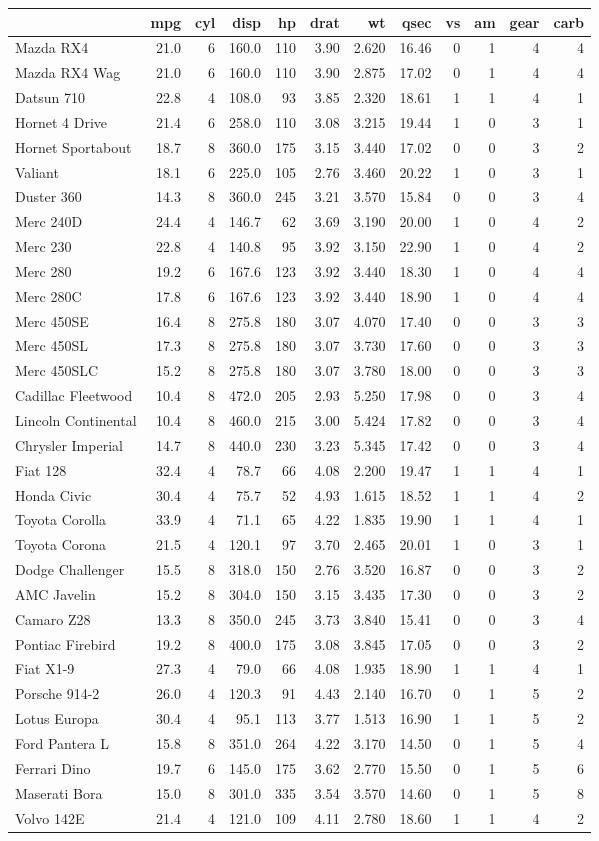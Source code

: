 \documentclass[11pt,english,a4paper,oneside]{article}
\begin{document}
\begin{longtable}[]{@{}lrrrrrrrrrrr@{}}
\toprule
& mpg & cyl & disp & hp & drat & wt & qsec & vs & am & gear &
carb\tabularnewline
\midrule
\endhead
Mazda RX4 & 21.0 & 6 & 160.0 & 110 & 3.90 & 2.620 & 16.46 & 0 & 1 & 4 &
4\tabularnewline
Mazda RX4 Wag & 21.0 & 6 & 160.0 & 110 & 3.90 & 2.875 & 17.02 & 0 & 1 &
4 & 4\tabularnewline
Datsun 710 & 22.8 & 4 & 108.0 & 93 & 3.85 & 2.320 & 18.61 & 1 & 1 & 4 &
1\tabularnewline
Hornet 4 Drive & 21.4 & 6 & 258.0 & 110 & 3.08 & 3.215 & 19.44 & 1 & 0 &
3 & 1\tabularnewline
Hornet Sportabout & 18.7 & 8 & 360.0 & 175 & 3.15 & 3.440 & 17.02 & 0 &
0 & 3 & 2\tabularnewline
Valiant & 18.1 & 6 & 225.0 & 105 & 2.76 & 3.460 & 20.22 & 1 & 0 & 3 &
1\tabularnewline
Duster 360 & 14.3 & 8 & 360.0 & 245 & 3.21 & 3.570 & 15.84 & 0 & 0 & 3 &
4\tabularnewline
Merc 240D & 24.4 & 4 & 146.7 & 62 & 3.69 & 3.190 & 20.00 & 1 & 0 & 4 &
2\tabularnewline
Merc 230 & 22.8 & 4 & 140.8 & 95 & 3.92 & 3.150 & 22.90 & 1 & 0 & 4 &
2\tabularnewline
Merc 280 & 19.2 & 6 & 167.6 & 123 & 3.92 & 3.440 & 18.30 & 1 & 0 & 4 &
4\tabularnewline
Merc 280C & 17.8 & 6 & 167.6 & 123 & 3.92 & 3.440 & 18.90 & 1 & 0 & 4 &
4\tabularnewline
Merc 450SE & 16.4 & 8 & 275.8 & 180 & 3.07 & 4.070 & 17.40 & 0 & 0 & 3 &
3\tabularnewline
Merc 450SL & 17.3 & 8 & 275.8 & 180 & 3.07 & 3.730 & 17.60 & 0 & 0 & 3 &
3\tabularnewline
Merc 450SLC & 15.2 & 8 & 275.8 & 180 & 3.07 & 3.780 & 18.00 & 0 & 0 & 3
& 3\tabularnewline
Cadillac Fleetwood & 10.4 & 8 & 472.0 & 205 & 2.93 & 5.250 & 17.98 & 0 &
0 & 3 & 4\tabularnewline
Lincoln Continental & 10.4 & 8 & 460.0 & 215 & 3.00 & 5.424 & 17.82 & 0
& 0 & 3 & 4\tabularnewline
Chrysler Imperial & 14.7 & 8 & 440.0 & 230 & 3.23 & 5.345 & 17.42 & 0 &
0 & 3 & 4\tabularnewline
Fiat 128 & 32.4 & 4 & 78.7 & 66 & 4.08 & 2.200 & 19.47 & 1 & 1 & 4 &
1\tabularnewline
Honda Civic & 30.4 & 4 & 75.7 & 52 & 4.93 & 1.615 & 18.52 & 1 & 1 & 4 &
2\tabularnewline
Toyota Corolla & 33.9 & 4 & 71.1 & 65 & 4.22 & 1.835 & 19.90 & 1 & 1 & 4
& 1\tabularnewline
Toyota Corona & 21.5 & 4 & 120.1 & 97 & 3.70 & 2.465 & 20.01 & 1 & 0 & 3
& 1\tabularnewline
Dodge Challenger & 15.5 & 8 & 318.0 & 150 & 2.76 & 3.520 & 16.87 & 0 & 0
& 3 & 2\tabularnewline
AMC Javelin & 15.2 & 8 & 304.0 & 150 & 3.15 & 3.435 & 17.30 & 0 & 0 & 3
& 2\tabularnewline
Camaro Z28 & 13.3 & 8 & 350.0 & 245 & 3.73 & 3.840 & 15.41 & 0 & 0 & 3 &
4\tabularnewline
Pontiac Firebird & 19.2 & 8 & 400.0 & 175 & 3.08 & 3.845 & 17.05 & 0 & 0
& 3 & 2\tabularnewline
Fiat X1-9 & 27.3 & 4 & 79.0 & 66 & 4.08 & 1.935 & 18.90 & 1 & 1 & 4 &
1\tabularnewline
Porsche 914-2 & 26.0 & 4 & 120.3 & 91 & 4.43 & 2.140 & 16.70 & 0 & 1 & 5
& 2\tabularnewline
Lotus Europa & 30.4 & 4 & 95.1 & 113 & 3.77 & 1.513 & 16.90 & 1 & 1 & 5
& 2\tabularnewline
Ford Pantera L & 15.8 & 8 & 351.0 & 264 & 4.22 & 3.170 & 14.50 & 0 & 1 &
5 & 4\tabularnewline
Ferrari Dino & 19.7 & 6 & 145.0 & 175 & 3.62 & 2.770 & 15.50 & 0 & 1 & 5
& 6\tabularnewline
Maserati Bora & 15.0 & 8 & 301.0 & 335 & 3.54 & 3.570 & 14.60 & 0 & 1 &
5 & 8\tabularnewline
Volvo 142E & 21.4 & 4 & 121.0 & 109 & 4.11 & 2.780 & 18.60 & 1 & 1 & 4 &
2\tabularnewline
\bottomrule
\end{longtable}
\end{document}
